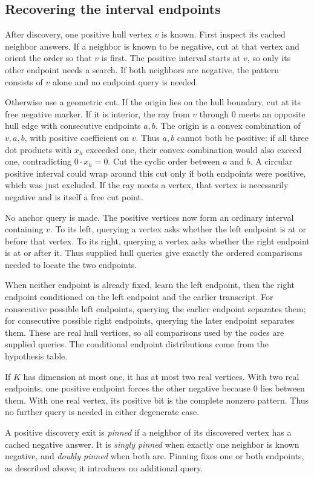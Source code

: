 \subsection{Recovering the interval endpoints}
\label{sec:endpoint-geometry}

After discovery, one positive hull vertex $v$ is known.
First inspect its cached neighbor answers. If a neighbor is known
to be negative, cut at that vertex and orient the order so that
$v$ is first. The positive interval starts at $v$, so only its
other endpoint needs a search. If both neighbors are negative,
the pattern consists of $v$ alone and no endpoint query is needed.

Otherwise use a geometric cut. If the origin lies on the hull
boundary, cut at its free negative
marker. If it is interior, the ray from $v$ through $0$ meets
an opposite hull edge with consecutive endpoints $a,b$.
The origin is a convex combination of $v,a,b$, with positive
coefficient on $v$. Thus $a,b$ cannot both be positive: if all
three dot products with $x_h$ exceeded one, their convex
combination would also exceed one, contradicting $0\cdot x_h=0$.
Cut the cyclic order between $a$ and $b$. A circular positive
interval could wrap around this cut only if both endpoints
were positive, which was just excluded. If the ray meets a
vertex, that vertex is necessarily negative and is itself a
free cut point.

No anchor query is made. The positive vertices now form an
ordinary interval containing $v$. To its left, querying a vertex asks whether
the left endpoint is at or before that vertex. To its right,
querying a vertex asks whether the right endpoint is at or after it.
Thus supplied hull queries give exactly the ordered comparisons
needed to locate the two endpoints.



When neither endpoint is already fixed, learn the left endpoint,
then the right endpoint conditioned on
the left endpoint and the earlier transcript. For consecutive
possible left endpoints, querying the earlier endpoint separates
them; for consecutive possible right endpoints, querying the later
endpoint separates them. These are real hull vertices, so all
comparisons used by the codes are supplied queries.
The conditional endpoint distributions come from the hypothesis table.

If $K$ has dimension at most one, it has at most two real vertices.
With two real endpoints, one positive endpoint forces the other
negative because $0$ lies between them. With one real vertex,
its positive bit is the complete nonzero pattern.
Thus no further query is needed in either degenerate case.

A positive discovery exit is \emph{pinned} if a neighbor of its
discovered vertex has a cached negative answer. It is
\emph{singly pinned} when exactly one neighbor is known negative,
and \emph{doubly pinned} when both are. Pinning fixes one or both
endpoints, as described above; it introduces no additional query.


